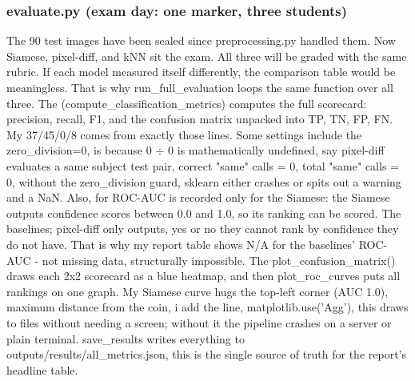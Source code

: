 \documentclass[conference]{IEEEtran}
\begin{document}
\subsubsection{evaluate.py (exam day: one marker, three students)}
The 90 test images have been sealed since preprocessing.py handled them. Now Siamese, pixel-diff, and kNN sit the exam. All three will be graded with the same rubric. If each model measured itself differently, the comparison table would be meaningless. That is why run\_full\_evaluation loops the same function over all three.
The (compute\_classification\_metrics) computes the full scorecard: precision, recall, F1, and the confusion matrix unpacked into TP, TN, FP, FN. My 37/45/0/8 comes from exactly those lines. Some settings include the zero\_division=0, is because 0 $\div$ 0 is mathematically undefined, say pixel-diff evaluates a same subject test pair, correct "same" calls = 0,  total "same" calls = 0, without the zero\_division guard, sklearn either crashes or spits out a warning and a NaN.
Also, for ROC-AUC is recorded only for the Siamese: the Siamese outputs confidence scores between 0.0 and 1.0, so its ranking can be scored. The baselines; pixel-diff only outputs, yes or no they cannot rank by confidence they do not have. That is why my report table shows N/A for the baselines' ROC-AUC - not missing data, structurally impossible.
The plot\_confusion\_matrix() draws each 2x2 scorecard as a blue heatmap, and then plot\_roc\_curves puts all rankings on one graph. My Siamese curve hugs the top-left corner (AUC 1.0), maximum distance from the coin, i add the line, matplotlib.use('Agg'), this draws to files without needing a screen; without it the pipeline crashes on a server or plain terminal.
save\_results writes everything to outputs/results/all\_metrics.json, this is the single source of truth for the report's headline table.
\end{document}
